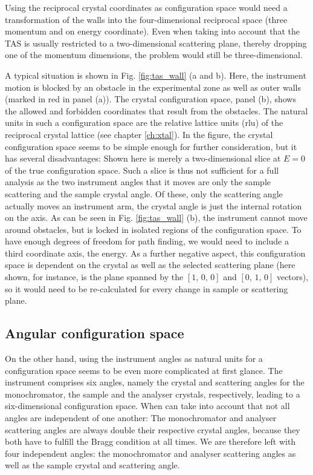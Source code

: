 Using the reciprocal crystal coordinates as configuration space would need a 
transformation of the walls into the four-dimensional reciprocal space 
(three momentum and on energy coordinate). Even when taking into account that 
the TAS is usually restricted to a two-dimensional scattering plane, thereby 
dropping one of the momentum dimensions, the problem would still be three-dimensional.

A typical situation is shown in Fig. \ref{fig:tas_wall} (a and b). 
Here, the instrument motion is blocked by an obstacle in the experimental zone
as well as outer walls (marked in red in panel (a)).
The crystal configuration space, panel (b), shows the allowed and forbidden
coordinates that result from the obstacles. The natural units in such a
configuration space are the relative lattice units (rlu) of the reciprocal
crystal lattice (see chapter \ref{ch:xtal}).
In the figure, the crystal configuration space seems to be simple enough for 
further consideration, but it has several disadvantages: Shown here is merely
a two-dimensional slice at $E = 0$ of the true configuration space.
Such a slice is thus not sufficient for a full analysis as the two instrument
angles that it moves are only the sample scattering and the sample crystal angle.
Of these, only the scattering angle actually moves an instrument arm, the crystal
angle is just the internal rotation on the axis.
As can be seen in Fig. \ref{fig:tas_wall} (b), the instrument cannot move
around obstacles, but is locked in isolated regions of the configuration space.
To have enough degrees of freedom for path finding, we would need to include
a third coordinate axis, the energy.
As a further negative aspect, this configuration space is dependent on the 
crystal as well as the selected scattering plane (here shown, for instance, 
is the plane spanned by the $\left[1,\,0,\,0\right]$ and $\left[0,\,1,\,0\right]$ 
vectors), so it would need to be re-calculated for every change in sample or 
scattering plane.


\subsection{Angular configuration space}
On the other hand, using the instrument angles as natural units for a configuration
space seems to be even more complicated at first glance. 
The instrument comprises six angles, namely the crystal and 
scattering angles for the monochromator, the sample and the analyser crystals, 
respectively, leading to a six-dimensional configuration space. 
When can take into account that not all angles are independent of one another:
The monochromator and analyser scattering angles are always double their 
respective crystal angles, because they both have to fulfill the Bragg condition
at all times. 
We are therefore left with four independent angles: the monochromator and analyser
scattering angles as well as the sample crystal and scattering angle. 

